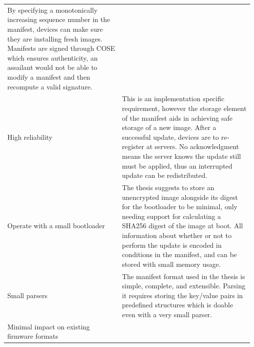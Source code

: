 \documentclass[0-thesis.tex]{subfiles}
\begin{document}
\begin{longtable}[]{@{}ll@{}}
\begin{minipage}[t]{0.53\columnwidth}
    By specifying a monotonically increasing sequence number in the
    manifest, devices can make sure they are installing fresh images.
    Manifests are signed through COSE which ensures authenticity, an
    assailant would not be able to modify a manifest and then recompute a
    valid signature.\strut
    \end{minipage}\tabularnewline
    \begin{minipage}[t]{0.41\columnwidth}\raggedright\strut
    High reliability\strut
    \end{minipage} & \begin{minipage}[t]{0.53\columnwidth}\raggedright\strut
    This is an implementation specific requirement, however the storage
    element of the manifest aids in achieving safe storage of a new image.
    After a successful update, devices are to re-register at servers. No
    acknowledgment means the server knows the update still must be applied,
    thus an interrupted update can be redistributed.\strut
    \end{minipage}\tabularnewline
    \begin{minipage}[t]{0.41\columnwidth}\raggedright\strut
    Operate with a small bootloader\strut
    \end{minipage} & \begin{minipage}[t]{0.53\columnwidth}\raggedright\strut
    The thesis suggests to store an unencrypted image alongside its digest
    for the bootloader to be minimal, only needing support for calculating a
    SHA256 digest of the image at boot. All information about whether or not
    to perform the update is encoded in conditions in the manifest, and can
    be stored with small memory usage.\strut
    \end{minipage}\tabularnewline
    \begin{minipage}[t]{0.41\columnwidth}\raggedright\strut
    Small parsers\strut
    \end{minipage} & \begin{minipage}[t]{0.53\columnwidth}\raggedright\strut
    The manifest format used in the thesis is simple, complete, and
    extensible. Parsing it requires storing the key/value pairs in
    predefined structures which is doable even with a very small
    parser.\strut
    \end{minipage}\tabularnewline
    \begin{minipage}[t]{0.41\columnwidth}\raggedright\strut
    Minimal impact on existing firmware formats\strut
    \end{minipage} & \begin{minipage}[t]{0.53\columnwidth}\raggedright\strut

\end{minipage}
\end{longtable}
\end{document}
